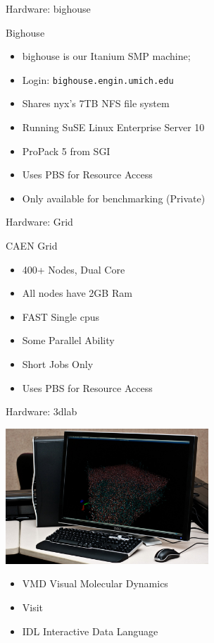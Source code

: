 \documentclass{beamer}
\begin{document}
  \begin{frame}{Hardware: bighouse}
    \begin{block}{Bighouse}
    \begin{itemize}
      \item bighouse is our Itanium SMP machine;
      \item Login: \texttt{bighouse.engin.umich.edu}
      \item Shares nyx's 7TB NFS file system
      \item Running SuSE Linux Enterprise Server 10
      \item ProPack 5 from SGI
      \item Uses PBS for Resource Access
      \item Only available for benchmarking (Private)
    \end{itemize}
   \end{block}
  \end{frame}
\begin{frame}{Hardware: Grid}
 \begin{block}{CAEN Grid}
  \begin{itemize}
   \item 400+ Nodes, Dual Core
   \item All nodes have 2GB Ram
   \item FAST Single cpus
   \item Some Parallel Ability
   \item Short Jobs Only
   \item Uses PBS for Resource Access
  \end{itemize}
 \end{block}
\end{frame}
\begin{frame}{Hardware: 3dlab}
 \begin{center}\includegraphics[height=2.0in]{3dlab}\end{center}
  \begin{itemize}
   \item VMD Visual Molecular Dynamics
   \item Visit
   \item IDL Interactive Data Language
  \end{itemize}
\end{frame}
  
\end{document}
